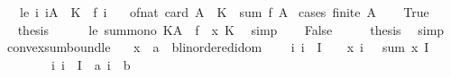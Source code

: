 \begin{isabellebody}
\ \ \ le{\isacharcolon}{\kern0pt}\ {\isachardoublequoteopen}{\isasymAnd}i{\isachardot}{\kern0pt}\ i{\isasymin}A\ {\isasymLongrightarrow}\ K\ {\isasymle}\ f\ i{\isachardoublequoteclose}\isanewline
\ \ \ {\isachardoublequoteopen}of{\isacharunderscore}{\kern0pt}nat\ {\isacharparenleft}{\kern0pt}card\ A{\isacharparenright}{\kern0pt}\ {\isacharasterisk}{\kern0pt}\ K\ {\isasymle}\ sum\ f\ A{\isachardoublequoteclose}\isanewline
%
\isadelimproof
%
\endisadelimproof
%
\isatagproof
{}\isamarkupfalse%
\ {\isacharparenleft}{\kern0pt}cases\ {\isachardoublequoteopen}finite\ A{\isachardoublequoteclose}{\isacharparenright}{\kern0pt}\isanewline
\ \ \isamarkupfalse%
\ True\isanewline
\ \ \isamarkupfalse%
\ \isamarkupfalse%
\ {\isacharquery}{\kern0pt}thesis\isanewline
\ \ \ \ \isamarkupfalse%
\ le\ sum{\isacharunderscore}{\kern0pt}mono{\isacharbrackleft}{\kern0pt}\ K{\isacharequal}{\kern0pt}A\ \ f\ {\isacharequal}{\kern0pt}\ {\isachardoublequoteopen}{\isasymlambda}x{\isachardot}{\kern0pt}\ K{\isachardoublequoteclose}{\isacharbrackright}{\kern0pt}\ \isamarkupfalse%
\ simp\isanewline
{}\isamarkupfalse%
\isanewline
\ \ \isamarkupfalse%
\ False\isanewline
\ \ \isamarkupfalse%
\ \isamarkupfalse%
\ {\isacharquery}{\kern0pt}thesis\ \isamarkupfalse%
\ simp\isanewline
{}\isamarkupfalse%
%
\endisatagproof
{\isafoldproof}%
%
\isadelimproof
\isanewline
%
\endisadelimproof
\isanewline
{}\isamarkupfalse%
\ convex{\isacharunderscore}{\kern0pt}sum{\isacharunderscore}{\kern0pt}bound{\isacharunderscore}{\kern0pt}le{\isacharcolon}{\kern0pt}\isanewline
\ \ \ x\ {\isacharcolon}{\kern0pt}{\isacharcolon}{\kern0pt}\ {\isachardoublequoteopen}{\isacharprime}{\kern0pt}a\ {\isasymRightarrow}\ {\isacharprime}{\kern0pt}b{\isacharcolon}{\kern0pt}{\isacharcolon}{\kern0pt}linordered{\isacharunderscore}{\kern0pt}idom{\isachardoublequoteclose}\isanewline
\ \ \ {}{\isacharcolon}{\kern0pt}\ {\isachardoublequoteopen}{\isasymAnd}i{\isachardot}{\kern0pt}\ i\ {\isasymin}\ I\ {\isasymLongrightarrow}\ {}\ {\isasymle}\ x\ i{\isachardoublequoteclose}\ \ {}{\isacharcolon}{\kern0pt}\ {\isachardoublequoteopen}sum\ x\ I\ {\isacharequal}{\kern0pt}\ {}{\isachardoublequoteclose}\isanewline
\ \ \ \ \ \ \ {\isasymdelta}{\isacharcolon}{\kern0pt}\ {\isachardoublequoteopen}{\isasymAnd}i{\isachardot}{\kern0pt}\ i\ {\isasymin}\ I\ {\isasymLongrightarrow}\ {\isasymbar}a\ i\ {\isacharminus}{\kern0pt}\ b{\isasymbar}\ {\isasymle}\ {\isasymdelta}{\isachardoublequoteclose}\isanewline

\end{isabellebody}
